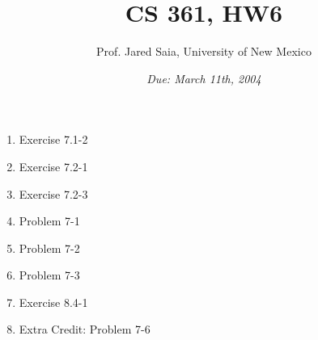 \documentclass[11pt]{article}
\begin{document}
\title{CS 361, HW6}

\author {Prof. Jared Saia, University of New Mexico}

\date{\emph{Due: March 11th, 2004}}
\maketitle

\begin{enumerate}
\item Exercise 7.1-2
\item Exercise 7.2-1
\item Exercise 7.2-3
\item Problem 7-1
\item Problem 7-2
\item Problem 7-3
\item Exercise 8.4-1
\item Extra Credit: Problem 7-6
\end{enumerate}
\end{document}
